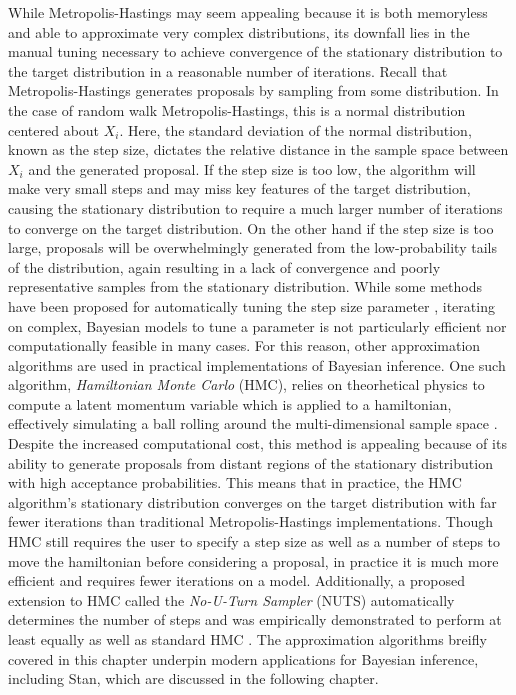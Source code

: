 \documentclass[
  12pt,
]{book}
\theoremstyle{definition}
\theoremstyle{definition}
\theoremstyle{definition}
\theoremstyle{remark}
\begin{document}
While Metropolis-Hastings may seem appealing because it is both memoryless and able to approximate very complex distributions, its downfall lies in the manual tuning necessary to achieve convergence of the stationary distribution to the target distribution in a reasonable number of iterations.
Recall that Metropolis-Hastings generates proposals by sampling from some distribution.
In the case of random walk Metropolis-Hastings, this is a normal distribution centered about \(X_{i}\).
Here, the standard deviation of the normal distribution, known as the step size, dictates the relative distance in the sample space between \(X_{i}\) and the generated proposal.
If the step size is too low, the algorithm will make very small steps and may miss key features of the target distribution, causing the stationary distribution to require a much larger number of iterations to converge on the target distribution.
On the other hand if the step size is too large, proposals will be overwhelmingly generated from the low-probability tails of the distribution, again resulting in a lack of convergence and poorly representative samples from the stationary distribution.
While some methods have been proposed for automatically tuning the step size parameter \citep{Graves2011}, iterating on complex, Bayesian models to tune a parameter is not particularly efficient nor computationally feasible in many cases.
For this reason, other approximation algorithms are used in practical implementations of Bayesian inference.
One such algorithm, \emph{Hamiltonian Monte Carlo} (HMC), relies on theorhetical physics to compute a latent momentum variable which is applied to a hamiltonian, effectively simulating a ball rolling around the multi-dimensional sample space \citep{Brooks2011}.
Despite the increased computational cost, this method is appealing because of its ability to generate proposals from distant regions of the stationary distribution with high acceptance probabilities.
This means that in practice, the HMC algorithm's stationary distribution converges on the target distribution with far fewer iterations than traditional Metropolis-Hastings implementations.
Though HMC still requires the user to specify a step size as well as a number of steps to move the hamiltonian before considering a proposal, in practice it is much more efficient and requires fewer iterations on a model.
Additionally, a proposed extension to HMC called the \emph{No-U-Turn Sampler} (NUTS) automatically determines the number of steps and was empirically demonstrated to perform at least equally as well as standard HMC \citep{Homan2014}.
The approximation algorithms breifly covered in this chapter underpin modern applications for Bayesian inference, including Stan, which are discussed in the following chapter.
\end{document}
